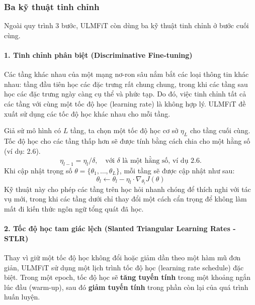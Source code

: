 \subsubsection{Ba kỹ thuật tinh chỉnh}
Ngoài quy trình 3 bước, ULMFiT còn dùng ba kỹ thuật tinh chỉnh ở bước cuối cùng.

\paragraph{1. Tinh chỉnh phân biệt (Discriminative Fine-tuning)}
Các tầng khác nhau của một mạng nơ-ron sâu nắm bắt các loại thông tin khác nhau: tầng đầu tiên học các đặc trưng rất chung chung, trong khi các tầng sau học các đặc trưng ngày càng cụ thể và phức tạp. Do đó, việc tinh chỉnh tất cả các tầng với cùng một tốc độ học (learning rate) là không hợp lý. ULMFiT đề xuất sử dụng các tốc độ học khác nhau cho mỗi tầng.

Giả sử mô hình có $L$ tầng, ta chọn một tốc độ học cơ sở $\eta_L$ cho tầng cuối cùng. Tốc độ học cho các tầng thấp hơn sẽ được tính bằng cách chia cho một hằng số (ví dụ: 2.6).
\[
\eta_{l-1} = \eta_l / \delta, \quad \text{với } \delta \text{ là một hằng số, ví dụ } 2.6.
\]
Khi cập nhật trọng số $\theta = \{\theta_1, \dots, \theta_L\}$, mỗi tầng sẽ được cập nhật như sau:
\begin{equation}
    \theta_l \leftarrow \theta_l - \eta_l \cdot \nabla_{\theta_l} J(\theta)
    \label{eq:discriminative_finetuning}
\end{equation}
Kỹ thuật này cho phép các tầng trên học hỏi nhanh chóng để thích nghi với tác vụ mới, trong khi các tầng dưới chỉ thay đổi một cách cẩn trọng để không làm mất đi kiến thức ngôn ngữ tổng quát đã học.

\paragraph{2. Tốc độ học tam giác lệch (Slanted Triangular Learning Rates - STLR)}
Thay vì giữ một tốc độ học không đổi hoặc giảm dần theo một hàm mũ đơn giản, ULMFiT sử dụng một lịch trình tốc độ học (learning rate schedule) đặc biệt. Trong một epoch, tốc độ học sẽ \textbf{tăng tuyến tính} trong một khoảng ngắn lúc đầu (warm-up), sau đó \textbf{giảm tuyến tính} trong phần còn lại của quá trình huấn luyện.

